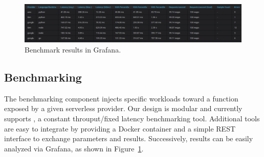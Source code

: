 \begin{figure}[!t]
\begin{center}
\includegraphics[width=1\textwidth]{bilder/benchmark_table.png}
\captionsetup{justification=centering, labelfont=bf}
\caption[Benchmark results in Grafana]{Benchmark results in Grafana.}
\label{fig:benchmark_table}
\end{center}
\end{figure}

\subsection{Benchmarking}
The benchmarking component injects specific workloads toward a function exposed by a given serverless provider.
Our design is modular and currently supports , a constant throuput/fixed latency benchmarking tool. 
Additional tools are easy to integrate by providing a Docker container and a simple REST interface to exchange parameters and results. 
Successively, results can be easily analyzed via Grafana, as shown in Figure~\ref{fig:benchmark_table}.




